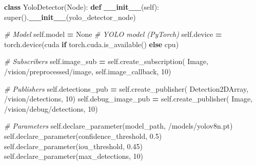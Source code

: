 \documentclass[
]{article}
\newenvironment{Shaded}{\begin{snugshade}}{\end{snugshade}}
\newcommand{\BuiltInTok}[1]{#1}
\newcommand{\CommentTok}[1]{\textcolor[rgb]{0.56,0.35,0.01}{\textit{#1}}}
\newcommand{\ControlFlowTok}[1]{\textcolor[rgb]{0.13,0.29,0.53}{\textbf{#1}}}
\newcommand{\DecValTok}[1]{\textcolor[rgb]{0.00,0.00,0.81}{#1}}
\newcommand{\FloatTok}[1]{\textcolor[rgb]{0.00,0.00,0.81}{#1}}
\newcommand{\FunctionTok}[1]{\textcolor[rgb]{0.13,0.29,0.53}{\textbf{#1}}}
\newcommand{\KeywordTok}[1]{\textcolor[rgb]{0.13,0.29,0.53}{\textbf{#1}}}
\newcommand{\NormalTok}[1]{#1}
\newcommand{\OperatorTok}[1]{\textcolor[rgb]{0.81,0.36,0.00}{\textbf{#1}}}
\newcommand{\StringTok}[1]{\textcolor[rgb]{0.31,0.60,0.02}{#1}}
\newcommand{\VariableTok}[1]{\textcolor[rgb]{0.00,0.00,0.00}{#1}}
\begin{document}
\begin{Shaded}
\begin{Highlighting}[]
\KeywordTok{class}\NormalTok{ YoloDetector(Node):}
    \KeywordTok{def} \FunctionTok{\_\_init\_\_}\NormalTok{(}\VariableTok{self}\NormalTok{):}
        \BuiltInTok{super}\NormalTok{().}\FunctionTok{\_\_init\_\_}\NormalTok{(}\StringTok{\textquotesingle{}yolo\_detector\_node\textquotesingle{}}\NormalTok{)}

        \CommentTok{\# Model}
        \VariableTok{self}\NormalTok{.model }\OperatorTok{=} \VariableTok{None}  \CommentTok{\# YOLO model (PyTorch)}
        \VariableTok{self}\NormalTok{.device }\OperatorTok{=}\NormalTok{ torch.device(}\StringTok{\textquotesingle{}cuda\textquotesingle{}} \ControlFlowTok{if}\NormalTok{ torch.cuda.is\_available() }\ControlFlowTok{else} \StringTok{\textquotesingle{}cpu\textquotesingle{}}\NormalTok{)}

        \CommentTok{\# Subscribers}
        \VariableTok{self}\NormalTok{.image\_sub }\OperatorTok{=} \VariableTok{self}\NormalTok{.create\_subscription(}
\NormalTok{            Image, }\StringTok{\textquotesingle{}/vision/preprocessed/image\textquotesingle{}}\NormalTok{, }\VariableTok{self}\NormalTok{.image\_callback, }\DecValTok{10}\NormalTok{)}

        \CommentTok{\# Publishers}
        \VariableTok{self}\NormalTok{.detections\_pub }\OperatorTok{=} \VariableTok{self}\NormalTok{.create\_publisher(}
\NormalTok{            Detection2DArray, }\StringTok{\textquotesingle{}/vision/detections\textquotesingle{}}\NormalTok{, }\DecValTok{10}\NormalTok{)}
        \VariableTok{self}\NormalTok{.debug\_image\_pub }\OperatorTok{=} \VariableTok{self}\NormalTok{.create\_publisher(}
\NormalTok{            Image, }\StringTok{\textquotesingle{}/vision/debug/detections\textquotesingle{}}\NormalTok{, }\DecValTok{10}\NormalTok{)}

        \CommentTok{\# Parameters}
        \VariableTok{self}\NormalTok{.declare\_parameter(}\StringTok{\textquotesingle{}model\_path\textquotesingle{}}\NormalTok{, }\StringTok{\textquotesingle{}/models/yolov8n.pt\textquotesingle{}}\NormalTok{)}
        \VariableTok{self}\NormalTok{.declare\_parameter(}\StringTok{\textquotesingle{}confidence\_threshold\textquotesingle{}}\NormalTok{, }\FloatTok{0.5}\NormalTok{)}
        \VariableTok{self}\NormalTok{.declare\_parameter(}\StringTok{\textquotesingle{}iou\_threshold\textquotesingle{}}\NormalTok{, }\FloatTok{0.45}\NormalTok{)}
        \VariableTok{self}\NormalTok{.declare\_parameter(}\StringTok{\textquotesingle{}max\_detections\textquotesingle{}}\NormalTok{, }\DecValTok{10}\NormalTok{)}


\end{Highlighting}
\end{Shaded}
\end{document}
